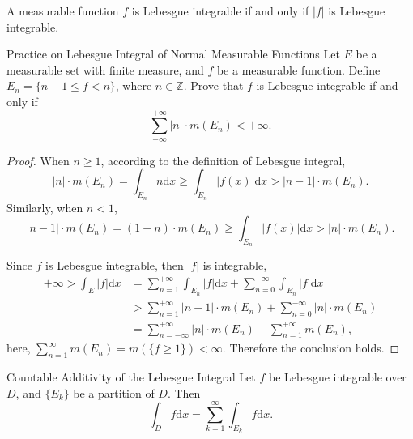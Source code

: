 \begin{note}
  A measurable function $f$ is Lebesgue integrable if and only if $|f|$
  is Lebesgue integrable.
\end{note}

\begin{example}{Practice on Lebesgue Integral of Normal Measurable Functions}{}
  Let $E$ be a measurable set with finite measure, and $f$ be a measurable function.
  Define $E_n = \{n - 1 \leq f < n\}$, where $n \in \mathbb{Z}$.
  Prove that $f$ is Lebesgue integrable if and only if
  \begin{equation}
    \sum\limits_{- \infty}^{+\infty} |n| \cdot m(E_n) < +\infty.
  \end{equation}
\end{example}

\begin{proof}
  When $n \geq 1$, according to the definition of Lebesgue integral,
  \begin{equation}
    |n| \cdot m(E_n) = \int_{E_n} n \mathrm{d} x \geq \int_{E_n} |f(x)| \mathrm{d}x
    > |n-1| \cdot m(E_n).
  \end{equation}
  Similarly, when $n < 1$,
  \begin{equation}
    |n - 1| \cdot m(E_n) = (1-n) \cdot m(E_n) \geq \int_{E_n} |f(x)|\mathrm{d}x
    > |n|\cdot m(E_n).
  \end{equation}

  Since $f$ is Lebesgue integrable, then $|f|$ is integrable,
  \begin{align}
    +\infty > \int_E |f|\mathrm{d} x
    &= \sum\limits_{n = 1}^{+\infty} \int_{E_n} |f|\mathrm{d}x + \sum\limits_{n = 0}^{-\infty} \int_{E_n}|f|\mathrm{d}x\\
    &> \sum\limits_{n = 1}^{+\infty} |n-1| \cdot m(E_n)
    + \sum\limits_{n = 0}^{-\infty} |n| \cdot m(E_n)\\
    &= \sum\limits_{n = -\infty}^{+\infty} |n| \cdot m(E_n) - \sum\limits_{n = 1}^{+\infty} m(E_n),
  \end{align}
  here, $\sum\limits_{n = 1}^{\infty} m(E_n) = m(\{f \geq 1\}) < \infty$.
  Therefore the conclusion holds.
\end{proof}


\begin{theorem}{Countable Additivity of the Lebesgue Integral}{}
  Let $f$ be Lebesgue integrable over $D$,
  and $\{E_k\}$ be a partition of $D$. Then
  \begin{equation}
    \int_D f \mathrm{d} x = \sum\limits_{k = 1}^{\infty} \int_{E_k} f \mathrm{d} x.
  \end{equation}
\end{theorem}

